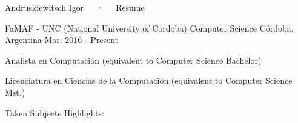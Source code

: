 \documentclass[10pt, a4paper]{resume}
\begin{document}
\makecvheader[L]

\makecvfooter
{ }
{Andruskiewitsch Igor~~~·~~~Resume}
{\thepage}



\begin{cventries}

    \cventry
    {FaMAF - UNC (National University of Cordoba)}
    {Computer Science}
    {Córdoba, Argentina}
    {Mar. 2016 - Present}
    {
        \begin{cvitems}
        \item {Analista en Computación (equivalent to Computer Science Bachelor)}
        \item{Licenciatura en Ciencias de la Computación (equivalent to Computer Science Mst.)}
        \item{Taken Subjects Highlights: \\
            }
        \end{cvitems}
    }

\end{cventries}



\end{document}

